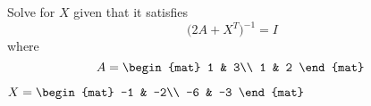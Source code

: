 
\begin{Exercise}[
name={},
title={}, 
difficulty=0,
origin={\cite{YL}}]
Solve for $X$ given that it satisfies
\[
\Big(2A+X^T\Big)^{-1}=I
\]
where
\[
A=
\begin{mat}
1 & 3\\
1 & 2
\end{mat}\;
\]

\end{Exercise}

\begin{Answer}
$
X=
\begin{mat}
-1 & -2\\
-6 & -3
\end{mat}
$
\end{Answer}
